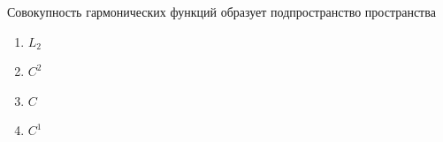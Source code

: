 Совокупность гармонических функций образует подпространство пространства

\begin{enumerate}[label=\arabic*)]
    \item \(L_2\)
    \item \(C^2\)
    \item \(C\)
    \item \(C^1\)
\end{enumerate}

